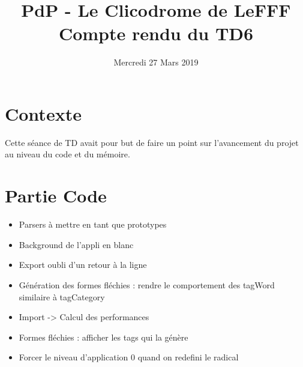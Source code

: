 \documentclass{article}
\title{PdP - Le Clicodrome de LeFFF \\ Compte rendu du TD6}
\author{}
\date{Mercredi 27 Mars 2019}
\begin{document}
\maketitle

\section{Contexte}
Cette séance de TD avait pour but de faire un point sur l'avancement du projet au niveau du code et du mémoire.

\section{Partie Code}
\begin{itemize}
    \item Parsers à mettre en tant que prototypes
    \item Background de l'appli en blanc
    \item Export oubli d'un retour à la ligne
    \item Génération des formes fléchies : rendre le comportement des tagWord similaire à tagCategory
    \item Import -> Calcul des performances
    \item Formes fléchies : afficher les tags qui la génère
    \item Forcer le niveau d'application 0 quand on redefini le radical
\end{itemize}
\end{document}
